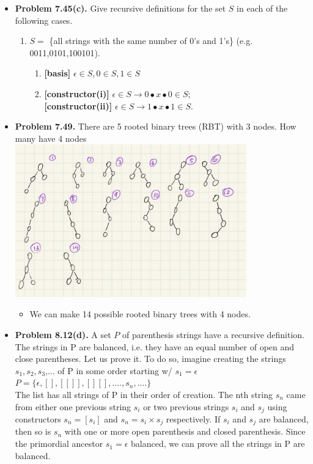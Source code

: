 \documentclass{article}
\begin{document}
\begin{itemize}
      
        \item \textbf{Problem 7.45(c).} Give recursive definitions for the set $S$ in each of the following cases.
        \begin{enumerate}[label=(c)]
            \item $S =$ \{all strings with the same number of 0's and 1's\} (e.g. 0011,0101,100101).
            \begin{enumerate}[label=\arabic*.]
                \item \textbf{[basis]} $\epsilon \in S, 0 \in S, 1 \in S$
                \item \textbf{[constructor(i)]} $\epsilon \in S \rightarrow 0 \bullet x \bullet 0 \in S$;\\
                \textbf{[constructor(ii)]} $\epsilon \in S \rightarrow 1 \bullet x \bullet 1 \in S$.
            \end{enumerate}
        \end{enumerate}
        \item \textbf{Problem 7.49.} There are 5 rooted binary trees (RBT) with 3 nodes. How many have 4 nodes\\
        \includegraphics[width=100mm,scale=0.5]{binaryTrees.png}
        \begin{itemize}[label=$\bullet$]
            \item We can make 14 possible rooted binary trees with 4 nodes.
        \end{itemize}
        \item \textbf{Problem 8.12(d).} A set $P$ of parenthesis strings have a recursive definition.
        The strings in P are balanced, i.e. they have an equal number of open and close parentheses. Let us prove it. To do so, imagine creating the strings $s_1,s_2,s_3$,... of P in some order starting w/ $s_1 = \epsilon$\\
        $P = \{\epsilon, [], [[]], [][],....,s_n,....\}$\\
The list has all strings of P in their order of creation. The nth string $s_n$ came from either one previous string $s_i$ or two previous strings $s_i$ and $s_j$ using constructors $s_n = [s_i]$ and $s_n = s_i \times s_j$ respectively. If $s_i$ and $s_j$ are balanced, then so is $s_n$ with one or more open parenthesis and closed parenthesis. Since the primordial ancestor $s_1 = \epsilon$ balanced, we can prove all the strings in P are balanced. \\


\end{itemize}
\end{document}
